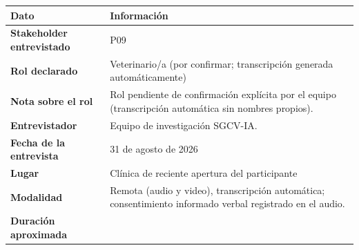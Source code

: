 \documentclass[
]{article}
\newcounter{none} %
\begin{document}
{\def\LTcaptype{none} %
\begin{longtable}[]{|
  >{\raggedright\arraybackslash}p{}|
  >{\raggedright\arraybackslash}p{}|}
\hline
\begin{minipage}[b]{\linewidth}\centering
\textbf{Dato}
\end{minipage} & \begin{minipage}[b]{\linewidth}\centering
\textbf{Información}
\end{minipage} \\
\hline
\endhead
\hline
\endlastfoot
\textbf{Stakeholder entrevistado} & \begin{minipage}[t]{\linewidth}\raggedright
P09
\end{minipage} \\
\hline
\textbf{Rol declarado} & \begin{minipage}[t]{\linewidth}\raggedright
Veterinario/a (por confirmar; transcripción generada automáticamente)
\end{minipage} \\
\hline
\textbf{Nota sobre el rol} & \begin{minipage}[t]{\linewidth}\raggedright
Rol pendiente de confirmación explícita por el equipo (transcripción automática sin nombres propios).
\end{minipage} \\
\hline
\textbf{Entrevistador} & \begin{minipage}[t]{\linewidth}\raggedright
Equipo de investigación SGCV-IA.
\end{minipage} \\
\hline
\textbf{Fecha de la entrevista} & \begin{minipage}[t]{\linewidth}\raggedright
31 de agosto de 2026
\end{minipage} \\
\hline
\textbf{Lugar} & \begin{minipage}[t]{\linewidth}\raggedright
Clínica de reciente apertura del participante
\end{minipage} \\
\hline
\textbf{Modalidad} & \begin{minipage}[t]{\linewidth}\raggedright
Remota (audio y video), transcripción automática; consentimiento informado verbal registrado en el audio.
\end{minipage} \\
\hline
\textbf{Duración aproximada} & \begin{minipage}[t]{\linewidth}\raggedright

\end{minipage}
\end{longtable}}
\end{document}
